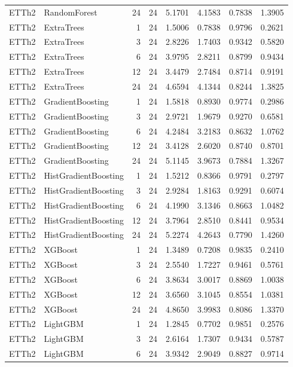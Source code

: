 \begin{tabular}{llrrrrrr}
ETTh2 & RandomForest & 24 & 24 & 5.1701 & 4.1583 & 0.7838 & 1.3905 \\
ETTh2 & ExtraTrees & 1 & 24 & 1.5006 & 0.7838 & 0.9796 & 0.2621 \\
ETTh2 & ExtraTrees & 3 & 24 & 2.8226 & 1.7403 & 0.9342 & 0.5820 \\
ETTh2 & ExtraTrees & 6 & 24 & 3.9795 & 2.8211 & 0.8799 & 0.9434 \\
ETTh2 & ExtraTrees & 12 & 24 & 3.4479 & 2.7484 & 0.8714 & 0.9191 \\
ETTh2 & ExtraTrees & 24 & 24 & 4.6594 & 4.1344 & 0.8244 & 1.3825 \\
ETTh2 & GradientBoosting & 1 & 24 & 1.5818 & 0.8930 & 0.9774 & 0.2986 \\
ETTh2 & GradientBoosting & 3 & 24 & 2.9721 & 1.9679 & 0.9270 & 0.6581 \\
ETTh2 & GradientBoosting & 6 & 24 & 4.2484 & 3.2183 & 0.8632 & 1.0762 \\
ETTh2 & GradientBoosting & 12 & 24 & 3.4128 & 2.6020 & 0.8740 & 0.8701 \\
ETTh2 & GradientBoosting & 24 & 24 & 5.1145 & 3.9673 & 0.7884 & 1.3267 \\
ETTh2 & HistGradientBoosting & 1 & 24 & 1.5212 & 0.8366 & 0.9791 & 0.2797 \\
ETTh2 & HistGradientBoosting & 3 & 24 & 2.9284 & 1.8163 & 0.9291 & 0.6074 \\
ETTh2 & HistGradientBoosting & 6 & 24 & 4.1990 & 3.1346 & 0.8663 & 1.0482 \\
ETTh2 & HistGradientBoosting & 12 & 24 & 3.7964 & 2.8510 & 0.8441 & 0.9534 \\
ETTh2 & HistGradientBoosting & 24 & 24 & 5.2274 & 4.2643 & 0.7790 & 1.4260 \\
ETTh2 & XGBoost & 1 & 24 & 1.3489 & 0.7208 & 0.9835 & 0.2410 \\
ETTh2 & XGBoost & 3 & 24 & 2.5540 & 1.7227 & 0.9461 & 0.5761 \\
ETTh2 & XGBoost & 6 & 24 & 3.8634 & 3.0017 & 0.8869 & 1.0038 \\
ETTh2 & XGBoost & 12 & 24 & 3.6560 & 3.1045 & 0.8554 & 1.0381 \\
ETTh2 & XGBoost & 24 & 24 & 4.8650 & 3.9983 & 0.8086 & 1.3370 \\
ETTh2 & LightGBM & 1 & 24 & 1.2845 & 0.7702 & 0.9851 & 0.2576 \\
ETTh2 & LightGBM & 3 & 24 & 2.6164 & 1.7307 & 0.9434 & 0.5787 \\
ETTh2 & LightGBM & 6 & 24 & 3.9342 & 2.9049 & 0.8827 & 0.9714 \\

\end{tabular}
